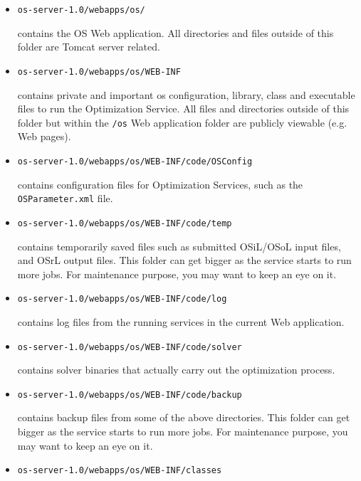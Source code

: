 \documentclass[11pt]{article}
\renewcommand{\_}{{\char"5F}}
\renewcommand{\{}{{\char"7B}}
\renewcommand{\}}{{\char"7D}}
\renewcommand{\^}{{\char"0D}}
\renewcommand{\'}{{\char"0D}}
\begin{document}
\begin{itemize}
\item
\begin{verbatim}
os-server-1.0/webapps/os/
\end{verbatim}
contains the OS Web application. All directories and files outside of this folder are Tomcat server related.
\item
\begin{verbatim}
os-server-1.0/webapps/os/WEB-INF
\end{verbatim}
contains private and important os configuration, library, class and executable files to run the Optimization Service. All files and directories outside of this folder but within the {\tt /os} Web application folder are publicly viewable (e.g. Web pages).
\item
\begin{verbatim}
os-server-1.0/webapps/os/WEB-INF/code/OSConfig
\end{verbatim}
contains configuration files for Optimization Services, such as the {\tt OSParameter.xml} file.
\item
\begin{verbatim}
os-server-1.0/webapps/os/WEB-INF/code/temp
\end{verbatim}
contains temporarily saved files such as submitted OSiL/OSoL input files, and OSrL output files. This folder can get bigger as the service starts to run more jobs. For maintenance purpose, you may want to keep an eye on it.
\item
\begin{verbatim}
os-server-1.0/webapps/os/WEB-INF/code/log
\end{verbatim}
contains log files from the running services in the current Web application.
\item
\begin{verbatim}
os-server-1.0/webapps/os/WEB-INF/code/solver
\end{verbatim}
contains solver binaries that actually carry out the optimization process.
\item
\begin{verbatim}
os-server-1.0/webapps/os/WEB-INF/code/backup
\end{verbatim}
contains backup files from some of the above directories. This folder can get bigger as the service starts to run more jobs. For maintenance purpose, you may want to keep an eye on it.
\item
\begin{verbatim}
os-server-1.0/webapps/os/WEB-INF/classes

\end{verbatim}
\end{itemize}
\end{document}
